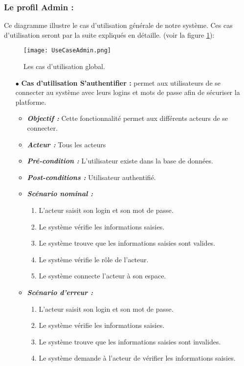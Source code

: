 \subsubsection{Le profil Admin :}
Ce diagramme illustre le cas d’utilisation générale de notre système. Ces cas d’utilisation seront par la suite expliqués en détaille. (voir la figure \ref{fig:UseCaseAdmin}):
\begin{figure}[ht]
  \centering
  \texttt{[image: UseCaseAdmin.png]}
  \caption{Les cas d'utilisation global.}
  \label{fig:UseCaseAdmin}
\end{figure}
\FloatBarrier
\begin{itemize}

\item[$\bullet$] \textbf{Cas d’utilisation S’authentifier :} permet aux utilisateurs de se connecter au système avec leurs logins et mots de passe afin de sécuriser la platforme.
\medskip
    \begin{itemize}
    \item \textit{\textbf{Objectif :}}  Cette fonctionnalité permet aux différents acteurs de se connecter. 

    \item \textit{\textbf{Acteur :}} Tous les acteurs

    \item \textit{\textbf{Pré-condition  :}} L’utilisateur existe dans la base de données.
\item \textit{\textbf{Post-conditions   :}} Utilisateur authentifié.
    \item \textit{\textbf{Scénario nominal :}}
         \begin{enumerate}
             \item L’acteur saisit son login et son mot de passe. 
             \item Le système vérifie les informations saisies. 
             \item Le système trouve que les informations saisies sont valides.  
             \item Le système vérifie le rôle de l’acteur.  
             \item Le système connecte l’acteur à son espace.
         \end{enumerate}
    \item \textit{\textbf{Scénario d'erreur :}} 
         \begin{enumerate}
             \item L’acteur saisit son login et son mot de passe. 
             \item Le système vérifie les informations saisies.   
             \item Le système trouve que les informations saisies sont invalides.  
             \item Le système demande à l’acteur de vérifier les informations saisies.
         \end{enumerate}
    \end{itemize}


\end{itemize}
